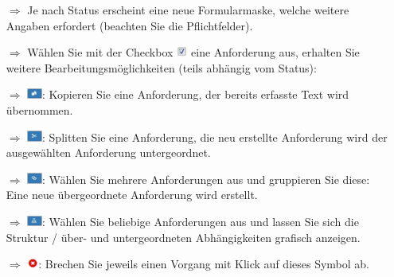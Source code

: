 \documentclass{article}
\begin{document}
\begin{multicols}{2}
\begin{tcolorbox}[colback=blue!5,colframe=blue!40!black,title=Status ändern]
\begin{itemize}
\end{itemize}
\end{tcolorbox}


\begin{tcolorbox}[colback=blue!5,colframe=blue!40!black,title=Weitere Hinweise und Funktionen]
\begin{itemize}
  \item[$\Longrightarrow$] Je nach Status erscheint eine neue Formularmaske, welche weitere Angaben erfordert (beachten Sie die Pflichtfelder).
  \item[$\Longrightarrow$] Wählen Sie mit der Checkbox \includegraphics[height=10pt]{Icons/checkbox_markiert.jpg} eine Anforderung aus, erhalten Sie weitere Bearbeitungsmöglichkeiten (teils abhängig vom Status):
  \item[$\Longrightarrow$] \includegraphics[height=10pt]{Icons/A_Kopieren.jpg}: Kopieren Sie eine Anforderung, der bereits erfasste Text wird übernommen.
	\item[$\Longrightarrow$] \includegraphics[height=10pt]{Icons/A_Splitten.jpg}: Splitten Sie eine Anforderung, die neu erstellte Anforderung wird der ausgewählten Anforderung untergeordnet.
	\item[$\Longrightarrow$] \includegraphics[height=10pt]{Icons/A_Gruppieren.jpg}: Wählen Sie mehrere Anforderungen aus und gruppieren Sie diese: Eine neue übergeordnete Anforderung wird erstellt.
	\item[$\Longrightarrow$] \includegraphics[height=10pt]{Icons/A_Anforderungsbaum.jpg}: Wählen Sie beliebige Anforderungen aus und lassen Sie sich die Struktur / über- und untergeordneten Abhängigkeiten grafisch anzeigen.
	\item[$\Longrightarrow$] \includegraphics[height=10pt]{Icons/Abbrechen_r.jpg}: Brechen Sie jeweils einen Vorgang mit Klick auf dieses Symbol ab.
\end{itemize}
\end{tcolorbox}


\end{multicols}


\end{document}
